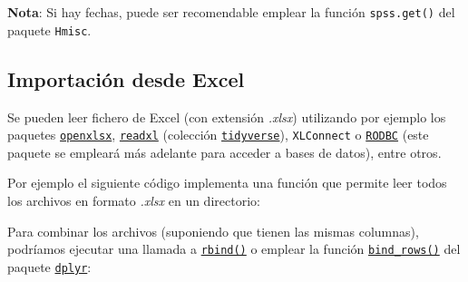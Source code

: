 \documentclass[]{book}
\newenvironment{Shaded}{\begin{snugshade}}{\end{snugshade}}
\newcommand{\KeywordTok}[1]{\textcolor[rgb]{0.13,0.29,0.53}{\textbf{#1}}}
\newcommand{\DataTypeTok}[1]{\textcolor[rgb]{0.13,0.29,0.53}{#1}}
\newcommand{\CharTok}[1]{\textcolor[rgb]{0.31,0.60,0.02}{#1}}
\newcommand{\StringTok}[1]{\textcolor[rgb]{0.31,0.60,0.02}{#1}}
\newcommand{\CommentTok}[1]{\textcolor[rgb]{0.56,0.35,0.01}{\textit{#1}}}
\newcommand{\ControlFlowTok}[1]{\textcolor[rgb]{0.13,0.29,0.53}{\textbf{#1}}}
\newcommand{\NormalTok}[1]{#1}
\begin{document}
\textbf{Nota}: Si hay fechas, puede ser recomendable emplear la función
\texttt{spss.get()} del paquete \texttt{Hmisc}.

\subsection{Importación desde Excel}\label{importacion-desde-excel}

Se pueden leer fichero de Excel (con extensión \emph{.xlsx}) utilizando
por ejemplo los paquetes
\href{https://cran.r-project.org/web/packages/openxlsx/index.html}{\texttt{openxlsx}},
\href{https://readxl.tidyverse.org}{\texttt{readxl}} (colección
\href{https://www.tidyverse.org/}{\texttt{tidyverse}}),
\texttt{XLConnect} o
\href{https://cran.r-project.org/web/packages/RODBC/index.html}{\texttt{RODBC}}
(este paquete se empleará más adelante para acceder a bases de datos),
entre otros.

Por ejemplo el siguiente código implementa una función que permite leer
todos los archivos en formato \emph{.xlsx} en un directorio:

\begin{Shaded}
\end{Shaded}

Para combinar los archivos (suponiendo que tienen las mismas columnas),
podríamos ejecutar una llamada a
\href{https://www.rdocumentation.org/packages/base/versions/3.6.1/topics/rbind}{\texttt{rbind()}}
o emplear la función
\href{https://www.rdocumentation.org/packages/dplyr/versions/0.7.8/topics/bind}{\texttt{bind\_rows()}}
del paquete \href{https://dplyr.tidyverse.org}{\texttt{dplyr}}:
\end{document}
